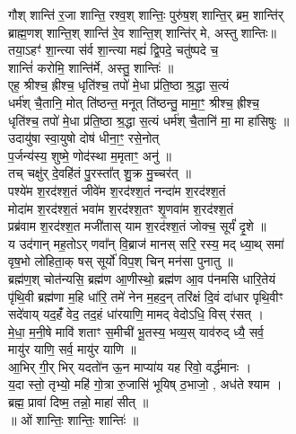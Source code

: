 गौश् शान्ति॑ र॒जा शान्ति॒ रश्व॒श् शान्तिः॒ पुरु॑ष॒श् शान्ति॒र् ब्रम॒  शान्ति॑र्\\
ब्राह्म॒णश् शान्ति॒श् शान्ति॑ रे॒व शान्ति॒श् शान्ति॑र् मे, अस्तु शान्तिः॥\\
तया॒ऽहꣳ॑ शा॒न्त्या स॑र्व शा॒न्त्या मह्यं॑ द्वि॒पदे॒ चतु॑ष्पदे च॒ \\
शान्तिं॑ करोमि॒ शान्ति॑र्मे, अस्तु॒ शान्तिः॑ ॥\\
एह॒ श्रीश्च॒ ह्रीश्च॒ धृति॑श्च॒ तपो॑ मे॒धा प्र॑ति॒ष्ठा श्र॒द्धा स॒त्यं \\
धर्म॑श् चै॒तानि॒ मोत् ति॑ष्ठन्त॒ मनूत् ति॑ष्ठन्तु॒ मामा॒॒ꣳ॒ श्रीश्च॒ ह्रीश्च॒ \\
धृति॑श्च॒ तपो॑ मे॒धा प्र॑ति॒ष्ठा श्र॒द्धा स॒त्यं धर्म॑श् चै॒तानि॑ मा॒ मा हा॑सिषुः ॥\\
उदायु॑षा स्वा॒युषो दोष॑ धीना॒ꣳ॒ रसे॒नोत् \\
प॒र्जन्य॑स्य॒ शुष्मे॒ णोद॑स्था म॒मृताꣳ॒ अनु॑ ॥\\
तच् चक्षु॑र् दे॒वहि॑तं पु॒रस्ता᳚त् शु॒क्र मु॒च्चर॑त् ॥\\
पश्ये॑म श॒रद॑श्श॒तं जीवे॑म श॒रद॑श्श॒तं नन्दा॑म श॒रद॑श्श॒तं \\
मोदा॑म श॒रद॑श्श॒तं भवा॑म श॒रद॑श्श॒तꣳ शृ॒णवा॑म श॒रद॑श्श॒तं \\
प्रब्र॑वाम श॒रद॑श्श॒त मजी॑तास् याम श॒रद॑श्श॒तं जोक्च॒ सूर्यं॑ दृ॒शे ॥\\
य उद॑गान् मह॒तोऽर् णवा᳚न् वि॒ब्राज॑ मानस् सरि॒ रस्य॒ मद् ध्या॒थ् समा॑\\
वृष॒भो लो॑हिता॒क् षस् सूर्यो॑ विप॒श् चिन् मन॑सा पुनातु ॥\\
ब्रह्म॑ण॒श् चोत॑न्यसि॒ ब्रह्म॑ण आ॒णीस्थो॒ ब्रह्म॑ण आ॒व प॑नमसि धारि॒तेयं \\
पृ॑थि॒वी ब्रह्म॑णा म॒हि धा॑रि॒ तमे॑ नेन म॒हद॒न् तरि॑क्षं दि॒वं दा॑धार पृथि॒वीꣳ \\
सदे॑वाय् यद॒हंँ वेद॒ तद॒हं धा॑रयाणि॒ मामद् वेदोऽधि॒ विस् र॑सत् । \\
मे॒धा॒ म॒नी॒षे मावि॑ शताꣳ स॒मीची॑ भू॒तस्य॒ भव्य॒स् याव॑रुद् ध्यै॒ सर्व॒ \\
मायु॑र याणि॒ सर्व॒ मायु॑र याणि ॥\\
आ॒भिर् गी॒र् भिर् यदतो॑न ऊ॒न माप्या॑य यह रिवो॒ वर्द्ध॑मानः । \\
य॒दा स्तो॒ तृभ्यो॒ महि॑ गो॒त्रा रु॒जासि॑ भूयिष् ठ॒भाजो॒ , अध॑ते श्याम ।\\
ब्रह्म॒ प्रावा॑ दिष्म॒ तन्नो॒ माहा॑ सीत् ॥\\
॥ ओं शान्तिः॒ शान्तिः॒ शान्तिः॑ ॥\\

